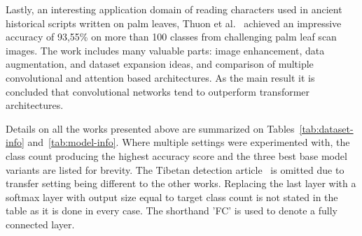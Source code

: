\documentclass[english,twoside,openright]{UH_DS_MSc}
\begin{document}





Lastly, an interesting application domain of reading characters used in ancient historical scripts written 
on palm leaves, Thuon et al.~\cite{9thuonPalm} achieved an impressive accuracy of 93,55\% on more than 100 
classes from challenging palm leaf scan images. The work includes many valuable parts: image enhancement,
data augmentation, and dataset expansion ideas, and comparison of multiple convolutional and attention based 
architectures. As the main result it is concluded that convolutional networks tend to outperform transformer architectures.

Details on all the works presented above are summarized on Tables~\ref{tab:dataset-info} and~\ref{tab:model-info}. Where multiple settings 
were experimented with, the class count producing the highest accuracy score and the three best 
base model variants are listed for brevity. The Tibetan detection article~\cite{4zhaoTibetan}
is omitted due to transfer setting being different to the other works. Replacing the last layer with a 
softmax layer with output size equal to target class count is not 
stated in the table as it is done in every case. The shorthand 'FC' is used to denote a fully connected layer.
\end{document}
